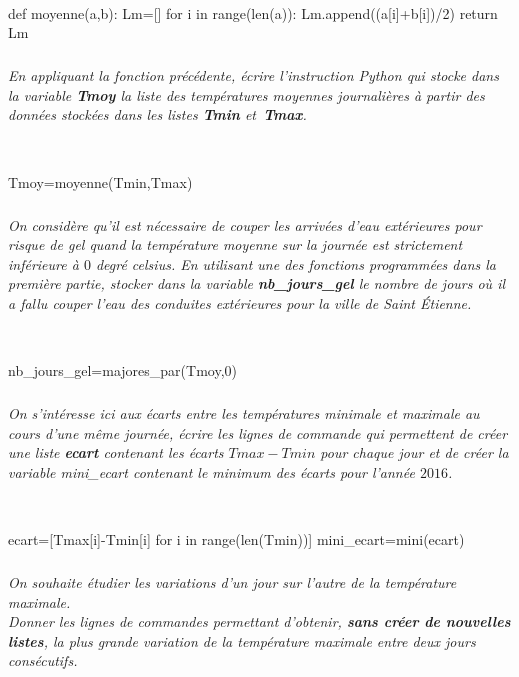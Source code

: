 \documentclass[10pt,fleqn]{article} %
\begin{document}
\ifprof
\begin{corrige}~\
\begin{python}
def moyenne(a,b):
    Lm=[]
    for i in range(len(a)):
        Lm.append((a[i]+b[i])/2)
    return Lm
\end{python}
\end{corrige}
\else
\fi
	
\subparagraph{} 
\textit{En appliquant la fonction précédente, écrire l'instruction Python 
	qui stocke dans la variable \textbf{Tmoy} la liste des températures moyennes 
	journalières à partir des données stockées dans les listes \textbf{Tmin} et~\textbf{Tmax}.}
	
\ifprof
\begin{corrige}~\
\begin{python}
Tmoy=moyenne(Tmin,Tmax)
\end{python}
\end{corrige}
\else
\fi

\subparagraph{} 
\textit{On considère qu'il est nécessaire de couper les arrivées d'eau 
	extérieures pour risque de gel quand la température moyenne sur la journée 
	est strictement inférieure à $0$ degré celsius. En utilisant une des fonctions 
	programmées dans la première partie, stocker dans la variable 
	\textbf{nb\_jours\_gel} le nombre de jours où il a fallu couper l'eau des 
	conduites extérieures pour la ville de Saint Étienne.}
	
\ifprof
\begin{corrige}~\
\begin{python}
nb_jours_gel=majores_par(Tmoy,0)
\end{python}
\end{corrige}
\else
\fi

\subparagraph{} 
\textit{On s'intéresse ici aux écarts entre les températures minimale et maximale au cours d'une même
 journée, écrire les lignes de commande qui permettent de créer une liste \textbf{ecart} 
 contenant les écarts $Tmax-Tmin$ pour chaque jour et de créer la variable mini\_ecart contenant 
 le minimum des écarts pour l'année $2016$.}

\ifprof
\begin{corrige}~\
\begin{python}
ecart=[Tmax[i]-Tmin[i] for i in range(len(Tmin))]
mini_ecart=mini(ecart)
\end{python}
\end{corrige}
\else
\fi
 
 \subparagraph{} 
\textit{On souhaite étudier les variations d'un jour sur l'autre de la température maximale.\\
 Donner les lignes de commandes permettant d'obtenir, \textbf{sans créer de nouvelles listes}, 
 la plus grande variation de la température maximale entre deux jours consécutifs.}
\end{document}
